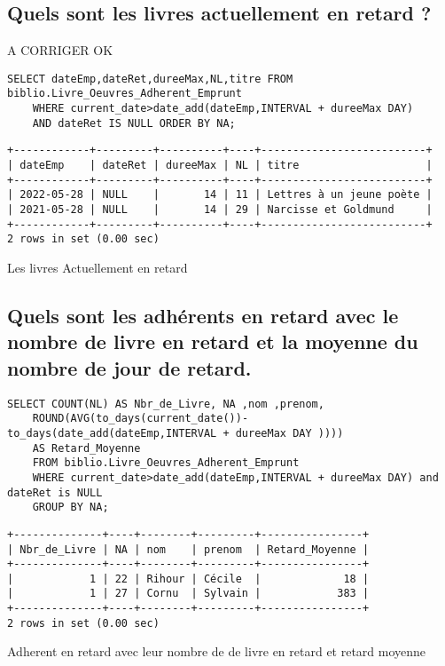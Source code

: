 \documentclass{article}
\begin{document}
\subsection{Quels sont les livres actuellement en retard ?}
A CORRIGER OK
\begin{listing}[H]
\begin{verbatim}
SELECT dateEmp,dateRet,dureeMax,NL,titre FROM biblio.Livre_Oeuvres_Adherent_Emprunt
	WHERE current_date>date_add(dateEmp,INTERVAL + dureeMax DAY)
	AND dateRet IS NULL ORDER BY NA;
\end{verbatim}
\begin{verbatim}
+------------+---------+----------+----+--------------------------+
| dateEmp    | dateRet | dureeMax | NL | titre                    |
+------------+---------+----------+----+--------------------------+
| 2022-05-28 | NULL    |       14 | 11 | Lettres à un jeune poète |
| 2021-05-28 | NULL    |       14 | 29 | Narcisse et Goldmund     |
+------------+---------+----------+----+--------------------------+
2 rows in set (0.00 sec)
\end{verbatim}
\caption{Les livres Actuellement en retard}
\end{listing}

\subsection{Quels sont les adhérents en retard avec le nombre de livre en retard et la moyenne du nombre de jour de retard.}
\begin{listing}[H]
\begin{verbatim}
SELECT COUNT(NL) AS Nbr_de_Livre, NA ,nom ,prenom,
    ROUND(AVG(to_days(current_date())-to_days(date_add(dateEmp,INTERVAL + dureeMax DAY ))))
	AS Retard_Moyenne
	FROM biblio.Livre_Oeuvres_Adherent_Emprunt
	WHERE current_date>date_add(dateEmp,INTERVAL + dureeMax DAY) and dateRet is NULL
	GROUP BY NA;
\end{verbatim}
\begin{verbatim}
+--------------+----+--------+---------+----------------+
| Nbr_de_Livre | NA | nom    | prenom  | Retard_Moyenne |
+--------------+----+--------+---------+----------------+
|            1 | 22 | Rihour | Cécile  |             18 |
|            1 | 27 | Cornu  | Sylvain |            383 |
+--------------+----+--------+---------+----------------+
2 rows in set (0.00 sec)
\end{verbatim}
\caption{Adherent en retard avec leur nombre de de livre en retard et retard moyenne}
\end{listing}
\end{document}

